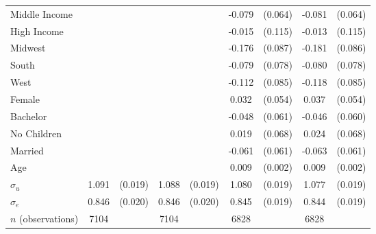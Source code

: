 \documentclass[12pt]{article}
\newcommand{\sym}[1]{\rlap{$^{#1}$}}
\begin{document}
\begin{table}[H]
{\begin{tabular}{l*{4}{cc}}
Middle Income&                     &            &                     &            &      -0.079         &     (0.064)&      -0.081         &     (0.064)\\
High Income &                     &            &                     &            &      -0.015         &     (0.115)&      -0.013         &     (0.115)\\
Midwest     &                     &            &                     &            &      -0.176\sym{**} &     (0.087)&      -0.181\sym{**} &     (0.086)\\
South       &                     &            &                     &            &      -0.079         &     (0.078)&      -0.080         &     (0.078)\\
West        &                     &            &                     &            &      -0.112         &     (0.085)&      -0.118         &     (0.085)\\
Female      &                     &            &                     &            &       0.032         &     (0.054)&       0.037         &     (0.054)\\
Bachelor    &                     &            &                     &            &      -0.048         &     (0.061)&      -0.046         &     (0.060)\\
No Children &                     &            &                     &            &       0.019         &     (0.068)&       0.024         &     (0.068)\\
Married     &                     &            &                     &            &      -0.061         &     (0.061)&      -0.063         &     (0.061)\\
Age         &                     &            &                     &            &       0.009\sym{***}&     (0.002)&       0.009\sym{***}&     (0.002)\\
\hline
$\sigma_u $    &       1.091\sym{***}&     (0.019)&       1.088\sym{***}&     (0.019)&       1.080\sym{***}&     (0.019)&       1.077\sym{***}&     (0.019)\\
$\sigma_e $     &       0.846\sym{***}&     (0.020)&       0.846\sym{***}&     (0.020)&       0.845\sym{***}&     (0.019)&       0.844\sym{***}&     (0.019)\\
\hline
\(n\) (observations)      &        7104         &            &        7104         &            &        6828         &            &        6828         &            \\


\end{tabular}}
\end{table}
\end{document}
